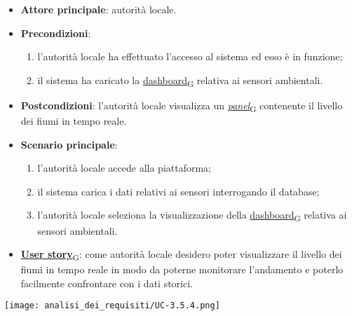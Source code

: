 \newpage
{}
\begin{itemize}
	\item \textbf{Attore principale}: autorità locale.
	\item \textbf{Precondizioni}:
	      \begin{enumerate}
		      \item l'autorità locale ha effettuato l'accesso al sistema ed esso è in funzione;
		      \item il sistema ha caricato la \href{https://7last.github.io/docs/pb/documentazione-interna/glossario\#dashboard}{dashboard\textsubscript{G}} relativa ai sensori ambientali.
	      \end{enumerate}
	\item \textbf{Postcondizioni}: l'autorità locale visualizza un \href{https://7last.github.io/docs/pb/documentazione-interna/glossario\#panel}{\textit{panel}\textsubscript{G}} contenente il livello dei fiumi in tempo reale.
	\item \textbf{Scenario principale}:
	      \begin{enumerate}
		      \item l'autorità locale accede alla piattaforma;
		      \item il sistema carica i dati relativi ai sensori interrogando il database;
		      \item l'autorità locale seleziona la visualizzazione della \href{https://7last.github.io/docs/pb/documentazione-interna/glossario\#dashboard}{dashboard\textsubscript{G}} relativa ai sensori ambientali.
	      \end{enumerate}
	\item \href{https://7last.github.io/docs/pb/documentazione-interna/glossario\#user-story}{\textbf{User story}\textsubscript{G}}:
	      come autorità locale desidero poter visualizzare il livello dei fiumi in tempo reale in modo da poterne monitorare l'andamento
	      e poterlo facilmente confrontare con i dati storici.
\end{itemize}
\begin{center}
	\texttt{[image: analisi\_dei\_requisiti/UC-3.5.4.png]}
\end{center}




